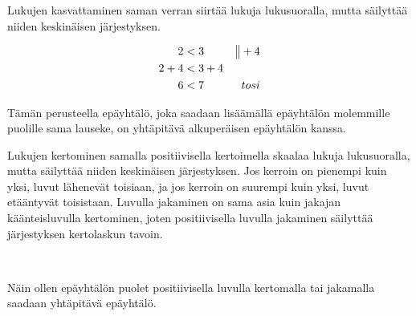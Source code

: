 Lukujen kasvattaminen saman verran siirtää lukuja lukusuoralla, mutta säilyttää niiden keskinäisen järjestyksen.

\begin{lukusuora}{-1}{10}{12}

\lukusuorauusi
\end{lukusuora}

\begin{align*}
     2 &< 3 & \big\| +4\\
   2+4 &< 3+4  \\
     6 &< 7 & tosi
\end{align*}


Tämän perusteella epäyhtälö, joka saadaan lisäämällä epäyhtälön molemmille puolille sama lauseke, on yhtäpitävä alkuperäisen epäyhtälön kanssa.

Lukujen kertominen samalla positiivisella kertoimella skaalaa lukuja lukusuoralla, mutta säilyttää niiden keskinäisen järjestyksen. Jos kerroin on pienempi kuin yksi, luvut lähenevät toisiaan, ja jos kerroin on suurempi kuin yksi, luvut etääntyvät toisistaan. Luvulla jakaminen on sama asia kuin jakajan käänteisluvulla kertominen, joten positiivisella luvulla jakaminen säilyttää järjestyksen kertolaskun tavoin.

\begin{lukusuora}{-1}{10}{12}

\lukusuorauusi
\end{lukusuora}

\ \\
\begin{lukusuora}{-1}{10}{12}

\lukusuorauusi
\end{lukusuora}

Näin ollen epäyhtälön puolet positiivisella luvulla kertomalla tai jakamalla saadaan yhtäpitävä epäyhtälö. 

